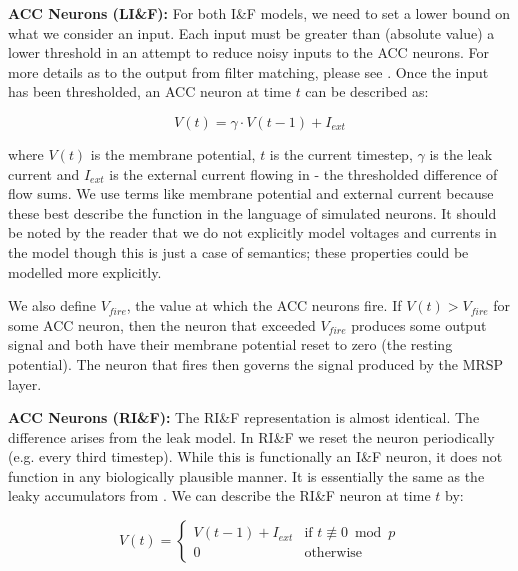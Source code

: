 \documentclass[a4paper,11pt,twoside,openright]{article}
\begin{document}
\textbf{ACC Neurons (LI\&F):} For both I\&F models, we need to set a
lower bound on what we consider an input.  Each input must be greater
than (absolute value) a lower threshold in an attempt to reduce noisy
inputs to the ACC neurons. For more details as to the output from
filter matching, please see \cite{Mitchell2018}. Once the input has
been thresholded, an ACC neuron at time $t$ can be described as:

\begin{equation}
  V(t) = \gamma \cdot V(t-1) + I_{ext}
\end{equation}

where $V(t)$ is the membrane potential, $t$ is the current timestep,
$\gamma$ is the leak current and $I_{ext}$ is the external current
flowing in - the thresholded difference of flow sums.  We use terms
like membrane potential and external current because these best
describe the function in the language of simulated neurons. It should
be noted by the reader that we do not explicitly model voltages and
currents in the model though this is just a case of semantics; these
properties could be modelled more explicitly.
\newline\par

We also define $V_{fire}$, the value at which the ACC neurons fire.
If $V(t) > V_{fire}$ for some ACC neuron, then the neuron that exceeded
$V_{fire}$ produces some output signal and both have their membrane potential
reset to zero (the resting potential). The neuron that fires then governs the
signal produced by the MRSP layer.
\newline\par

\textbf{ACC Neurons (RI\&F):}
The RI\&F representation is almost identical. The difference arises from the leak
model. In RI\&F we reset the neuron periodically (e.g. every third timestep).
While this is functionally an I\&F neuron, it does not function in any
biologically plausible manner. It is essentially the same as the leaky
accumulators from \cite{Mitchell2018}. We can describe the RI\&F neuron at time
$t$ by:

\begin{equation}
  V(t) =
  \begin{cases}
    V(t-1) + I_{ext} & \text{if } t \not\equiv 0 \bmod p \\
    0 & \text{otherwise}
  \end{cases}
\end{equation}
\end{document}
